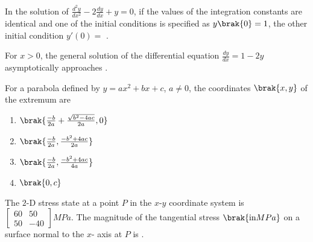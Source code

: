 \item In the solution of $\frac{d^2y}{dx^2}-2\frac{dy}{dx}+y=0$, if the values of the integration constants are identical and one of the initial conditions is specified as $y\brak{0}=1$, the other initial condition $y'(0)=$ \underline{\hspace{2cm}}.

\item For $x>0$, the general solution of the differential equation $\frac{dy}{dx}=1-2y$ asymptotically approaches \underline{\hspace{2cm}}.

\item For a parabola defined by $y=ax^2 + bx + c$, $a \neq 0$, the coordinates $\brak{x,y}$ of the extremum are 

\begin{enumerate}
	\item $\brak{ \frac{-b}{2a}+\frac{\sqrt{b^2-4ac}}{2a}, 0}$
	\item $\brak{ \frac{-b}{2a}, \frac{-b^2+4ac}{2a}}$
	\item $\brak{ \frac{-b}{2a}, \frac{-b^2+4ac}{4a}}$
	\item $\brak{0,c}$
\end{enumerate}

\item The $2$-D stress state at a point $P$ in the $x$-$y$ coordinate system is $\begin{bmatrix} 60 & 50 \\ 50 & -40 \end{bmatrix} MPa$. The magnitude of the tangential stress $\brak{\text{in} MPa}$ on a surface normal to the $x$- axis at $P$ is \underline{\hspace{2cm}}.


